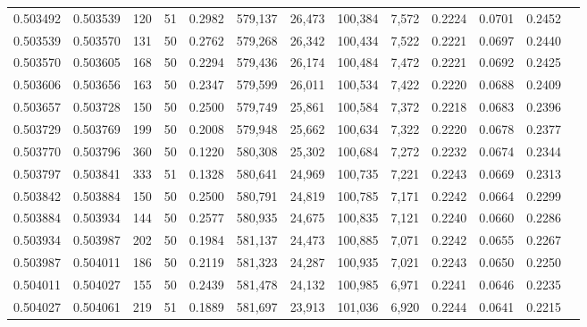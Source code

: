 \begin{tabular}{rrrrrrrrrrrrr}
0.503492 & 0.503539 & 120 &  51 &                                     0.2982 & 579,137 &  26,473 & 100,384 &   7,572 & 0.2224 & 0.0701 & 0.2452 \\
0.503539 & 0.503570 & 131 &  50 &                                     0.2762 & 579,268 &  26,342 & 100,434 &   7,522 & 0.2221 & 0.0697 & 0.2440 \\
0.503570 & 0.503605 & 168 &  50 &                                     0.2294 & 579,436 &  26,174 & 100,484 &   7,472 & 0.2221 & 0.0692 & 0.2425 \\
0.503606 & 0.503656 & 163 &  50 &                                     0.2347 & 579,599 &  26,011 & 100,534 &   7,422 & 0.2220 & 0.0688 & 0.2409 \\
0.503657 & 0.503728 & 150 &  50 &                                     0.2500 & 579,749 &  25,861 & 100,584 &   7,372 & 0.2218 & 0.0683 & 0.2396 \\
0.503729 & 0.503769 & 199 &  50 &                                     0.2008 & 579,948 &  25,662 & 100,634 &   7,322 & 0.2220 & 0.0678 & 0.2377 \\
0.503770 & 0.503796 & 360 &  50 &                                     0.1220 & 580,308 &  25,302 & 100,684 &   7,272 & 0.2232 & 0.0674 & 0.2344 \\
0.503797 & 0.503841 & 333 &  51 &                                     0.1328 & 580,641 &  24,969 & 100,735 &   7,221 & 0.2243 & 0.0669 & 0.2313 \\
0.503842 & 0.503884 & 150 &  50 &                                     0.2500 & 580,791 &  24,819 & 100,785 &   7,171 & 0.2242 & 0.0664 & 0.2299 \\
0.503884 & 0.503934 & 144 &  50 &                                     0.2577 & 580,935 &  24,675 & 100,835 &   7,121 & 0.2240 & 0.0660 & 0.2286 \\
0.503934 & 0.503987 & 202 &  50 &                                     0.1984 & 581,137 &  24,473 & 100,885 &   7,071 & 0.2242 & 0.0655 & 0.2267 \\
0.503987 & 0.504011 & 186 &  50 &                                     0.2119 & 581,323 &  24,287 & 100,935 &   7,021 & 0.2243 & 0.0650 & 0.2250 \\
0.504011 & 0.504027 & 155 &  50 &                                     0.2439 & 581,478 &  24,132 & 100,985 &   6,971 & 0.2241 & 0.0646 & 0.2235 \\
0.504027 & 0.504061 & 219 &  51 &                                     0.1889 & 581,697 &  23,913 & 101,036 &   6,920 & 0.2244 & 0.0641 & 0.2215 \\

\end{tabular}
